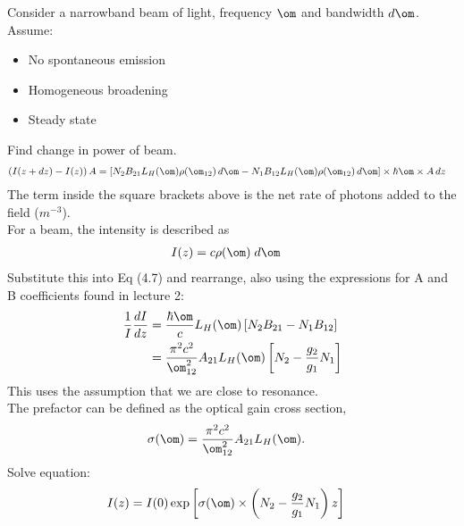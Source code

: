 \documentclass[a4paper, 11pt, normalem]{report}
\begin{document}
\begin{figure}[H]
    \centering
\end{figure}
Consider a  narrowband beam of light, frequency $\om$ and bandwidth $d\om$. \\
Assume:
\begin{itemize}
    \item No spontaneous emission
    \item Homogeneous broadening
    \item Steady state
\end{itemize}
Find change in power of beam.
\begin{align}
    \left(I(z+dz) - I(z)\right)A &= \left[N_2B_{21}L_H(\om)\rho(\om_{12})\,d\om - N_1B_{12}L_H(\om)\rho(\om_{12})\,d\om\right]\times\hbar\om\times A\,dz
\end{align}
The term inside the square brackets above is the net rate of photons added to the field ($m^{-3}$).\\
For a beam, the intensity is described as
\begin{align}
    I(z) &= c\rho(\om)\;d\om 
\end{align}
Substitute this into Eq (4.7) and rearrange, also using the expressions for A and B coefficients found in lecture 2: 
\begin{align}
    \frac{1}{I}\frac{dI}{dz} &= \frac{\hbar\om}{c}L_H(\om)\left[N_2B_{21} - N_1B_{12}\right] \\
                             &= \frac{\pi^2c^2}{\om^2_{12}}A_{21}L_H(\om)\left[N_2 - \frac{g_2}{g_1}N_1\right]
\end{align}
This uses the assumption that we are close to resonance.\\
The prefactor can be defined as the optical gain cross section,
\begin{align}
    \sigma(\om) &= \frac{\pi^2c^2}{\om_{12}^2}A_{21}L_H(\om).
\end{align}
Solve equation:
\begin{align}
    I(z) &= I(0)\exp\left[\sigma(\om)\times\left(N_2-\frac{g_2}{g_1}N_1\right)z\right]
\end{align}
\end{document}
